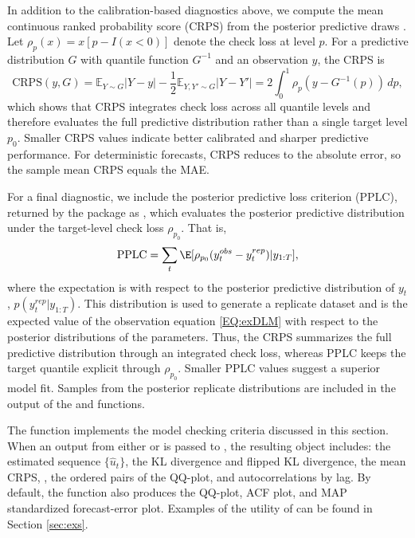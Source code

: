 \documentclass[jss]{jss}
\newcommand{\PPLC}{\operatorname{PPLC}}
\begin{document}
In addition to the calibration-based diagnostics above, we compute the mean continuous ranked probability score (CRPS) from the posterior predictive draws \citep{gneiting2007}. Let $\rho_p(x)=x[p-I(x<0)]$ denote the check loss at level $p$. For a predictive distribution $G$ with quantile function $G^{-1}$ and an observation $y$, the CRPS is
\[
\text{CRPS}(y,G)=\mathbb{E}_{Y\sim G}|Y-y|-\frac{1}{2}\mathbb{E}_{Y,Y'\sim G}|Y-Y'|
=2\int_0^1 \rho_p\!\left(y-G^{-1}(p)\right)\,dp,
\]
which shows that CRPS integrates check loss across all quantile levels and therefore evaluates the full predictive distribution rather than a single target level \(p_0\). Smaller CRPS values indicate better calibrated and sharper predictive performance. For deterministic forecasts, CRPS reduces to the absolute error, so the sample mean CRPS equals the MAE.

For a final diagnostic, we include the \cite{gelfand1998model} posterior predictive loss criterion (PPLC), returned by the package as , which evaluates the posterior predictive distribution under the target-level check loss $\rho_{p_0}$. That is,
\begin{align}
\PPLC = \sum_t \E[\rho_{p_0} (y_t^{obs}-y^{rep}_t)|y_{1:T}],
\end{align}
where the expectation is with respect to the posterior predictive distribution of $y_t$, $p(y^{rep}_t| y_{1:T})$. This distribution is used to generate a replicate dataset and is the expected value of the observation equation \eqref{EQ:exDLM} with respect to the posterior distributions of the parameters. Thus, the CRPS summarizes the full predictive distribution through an integrated check loss, whereas PPLC keeps the target quantile explicit through $\rho_{p_0}$. Smaller PPLC values suggest a superior model fit. Samples from the posterior replicate distributions are included in the output of the  and  functions.

The function  implements the model checking criteria discussed in this section. When an output from either  or  is passed to , the resulting object includes: the estimated sequence $\{\hat u_t\}$, the KL divergence and flipped KL divergence, the mean CRPS, , the ordered pairs of the QQ-plot, and autocorrelations by lag. By default, the function also produces the QQ-plot, ACF plot, and MAP standardized forecast-error plot.  Examples of the utility of  can be found in Section \ref{sec:exs}.
\end{document}
